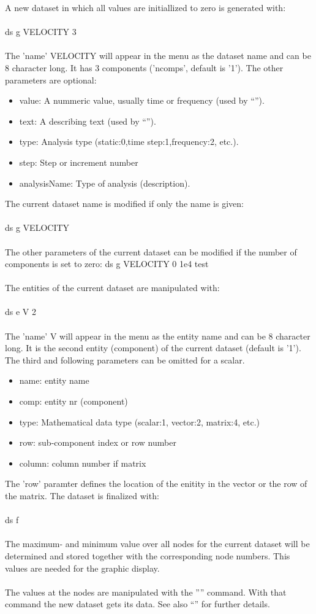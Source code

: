 \documentclass{article}
\begin{document}
A new dataset in which all values are initiallized to zero is generated with:\\\\ 
ds g VELOCITY 3\\\\
The 'name' VELOCITY will appear in the menu as the dataset name and can be 8 character long. It has 3 components ('ncomps', default is '1'). The other parameters are optional:
\begin{itemize}
\item  value: A nummeric value, usually time or frequency (used by ``'').
\item  text:  A describing text (used by ``'').
\item  type:  Analysis type (static:0,time step:1,frequency:2, etc.).
\item  step:  Step or increment number
\item  analysisName: Type of analysis (description).
\end{itemize}
The current dataset name is modified if only the name is given:\\\\ 
ds g VELOCITY\\\\
The other parameters of the current dataset can be modified if the number of components is set to zero:
ds g VELOCITY 0 1e4 test\\\\
The entities of the current dataset are manipulated with:\\\\
ds e V 2\\\\
The 'name' V will appear in the menu as the entity name and can be 8 character long. It is the second entity (component) of the current dataset (default is '1'). The third and following parameters can be omitted for a scalar.
\begin{itemize}
\item  name:   entity name
\item  comp:   entity nr (component)
\item  type:   Mathematical data type (scalar:1, vector:2, matrix:4, etc.)
\item  row:    sub-component index or row number
\item  column: column number if matrix
\end{itemize}
The 'row' paramter defines the location of the enitity in the vector or the row of the matrix. 
The dataset is finalized with:\\\\
ds f\\\\
The maximum- and minimum value over all nodes for the current dataset will be determined and stored together with the corresponding node numbers. This values are needed for the graphic display.\\\\
The values at the nodes are manipulated with the '''' command. With that command the new dataset gets its data. See also ``'' for further details.
\end{document}
